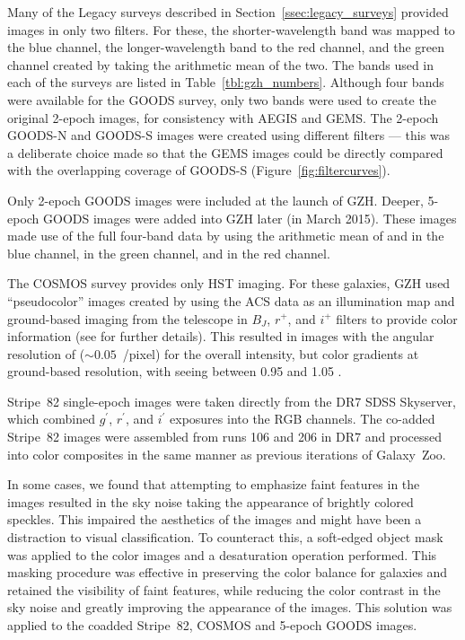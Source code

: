 \documentclass[twocolumn]{aastex6}
\begin{document}
Many of the Legacy surveys described in Section~\ref{ssec:legacy_surveys}
provided \hst{} images in only two filters. For these, the shorter-wavelength band was
mapped to the blue channel, the longer-wavelength band to the red channel, and
the green channel created by taking the arithmetic mean of the two. The bands
used in each of the surveys are listed in Table~\ref{tbl:gzh_numbers}.
Although four bands were available for the GOODS survey, only two bands were
used to create the original 2-epoch images, for consistency with AEGIS and
GEMS. The 2-epoch GOODS-N and GOODS-S images were created using different
filters --- this was a deliberate choice made so that the GEMS images could be
directly compared with the overlapping coverage of GOODS-S
(Figure~\ref{fig:filtercurves}).

Only 2-epoch GOODS images were included at the launch of GZH.  Deeper, 5-epoch 
GOODS images were added into GZH later (in March 2015). These images made
use of the full four-band data by using the arithmetic mean of \Bband{} and
\Vband{} in the blue channel, \Iband{} in the green channel, and \zband{} in
the red channel.

The COSMOS survey provides only \Iband{} HST imaging. For these galaxies, GZH
used ``pseudocolor'' images created by using the ACS \Iband{} data as an
illumination map and ground-based imaging from the \subaru{} telescope in
$B_J$, $r^+$, and $i^+$ filters to provide color information (see
\citealt{gri12} for further details). This resulted in images with the angular
resolution of \hst{} ($\sim0.05$~\arcsec/pixel) for the overall intensity, but
color gradients at ground-based resolution, with seeing between 0.95\arcsec{}
and 1.05\arcsec{} \citep{tan07}.

Stripe~82 single-epoch images were taken directly from the DR7 SDSS Skyserver,
which combined $g^{\prime}$, $r^{\prime}$, and $i^{\prime}$ exposures into the
RGB channels. The co-added Stripe~82 images were assembled from runs 106 and
206 in DR7 and processed into color composites in the same manner as previous
iterations of Galaxy~Zoo.

In some cases, we found that attempting to emphasize faint features in the
images resulted in the sky noise taking the appearance of brightly colored
speckles. This impaired the aesthetics of the images and might have been a
distraction to visual classification.  To counteract this, a soft-edged object
mask was applied to the color images and a desaturation operation performed.
This masking procedure was effective in preserving the color balance for
galaxies and retained the visibility of faint features, while reducing the color
contrast in the sky noise and greatly improving the appearance of the images.
This solution was applied to the coadded Stripe~82, COSMOS and 5-epoch GOODS
images.
\end{document}
